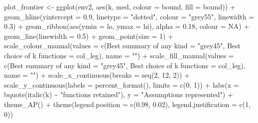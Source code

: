 \documentclass[
  11pt,
]{article}
\newenvironment{Shaded}{\begin{snugshade}}{\end{snugshade}}
\newcommand{\AttributeTok}[1]{\textcolor[rgb]{0.77,0.63,0.00}{#1}}
\newcommand{\ConstantTok}[1]{\textcolor[rgb]{0.00,0.00,0.00}{#1}}
\newcommand{\DecValTok}[1]{\textcolor[rgb]{0.00,0.00,0.81}{#1}}
\newcommand{\FloatTok}[1]{\textcolor[rgb]{0.00,0.00,0.81}{#1}}
\newcommand{\FunctionTok}[1]{\textcolor[rgb]{0.00,0.00,0.00}{#1}}
\newcommand{\NormalTok}[1]{#1}
\newcommand{\OtherTok}[1]{\textcolor[rgb]{0.56,0.35,0.01}{#1}}
\newcommand{\SpecialCharTok}[1]{\textcolor[rgb]{0.00,0.00,0.00}{#1}}
\newcommand{\StringTok}[1]{\textcolor[rgb]{0.31,0.60,0.02}{#1}}
\begin{document}
\begin{Shaded}
\begin{Highlighting}[]
\NormalTok{plot\_frontier }\OtherTok{\textless{}{-}} \FunctionTok{ggplot}\NormalTok{(env2, }\FunctionTok{aes}\NormalTok{(k, med, }\AttributeTok{colour =}\NormalTok{ bound, }\AttributeTok{fill =}\NormalTok{ bound)) }\SpecialCharTok{+}
  \FunctionTok{geom\_hline}\NormalTok{(}\AttributeTok{yintercept =} \FloatTok{0.9}\NormalTok{, }\AttributeTok{linetype =} \StringTok{"dotted"}\NormalTok{, }\AttributeTok{colour =} \StringTok{"grey55"}\NormalTok{,}
             \AttributeTok{linewidth =} \FloatTok{0.3}\NormalTok{) }\SpecialCharTok{+}
  \FunctionTok{geom\_ribbon}\NormalTok{(}\FunctionTok{aes}\NormalTok{(}\AttributeTok{ymin =}\NormalTok{ lo, }\AttributeTok{ymax =}\NormalTok{ hi), }\AttributeTok{alpha =} \FloatTok{0.18}\NormalTok{, }\AttributeTok{colour =} \ConstantTok{NA}\NormalTok{) }\SpecialCharTok{+}
  \FunctionTok{geom\_line}\NormalTok{(}\AttributeTok{linewidth =} \FloatTok{0.5}\NormalTok{) }\SpecialCharTok{+}
  \FunctionTok{geom\_point}\NormalTok{(}\AttributeTok{size =} \DecValTok{1}\NormalTok{) }\SpecialCharTok{+}
  \FunctionTok{scale\_colour\_manual}\NormalTok{(}\AttributeTok{values =} \FunctionTok{c}\NormalTok{(}\StringTok{\textasciigrave{}}\AttributeTok{Best summary of any kind}\StringTok{\textasciigrave{}} \OtherTok{=} \StringTok{"grey45"}\NormalTok{,}
                                 \StringTok{\textasciigrave{}}\AttributeTok{Best choice of k functions}\StringTok{\textasciigrave{}} \OtherTok{=}\NormalTok{ col\_leg),}
                      \AttributeTok{name =} \StringTok{""}\NormalTok{) }\SpecialCharTok{+}
  \FunctionTok{scale\_fill\_manual}\NormalTok{(}\AttributeTok{values =} \FunctionTok{c}\NormalTok{(}\StringTok{\textasciigrave{}}\AttributeTok{Best summary of any kind}\StringTok{\textasciigrave{}} \OtherTok{=} \StringTok{"grey45"}\NormalTok{,}
                               \StringTok{\textasciigrave{}}\AttributeTok{Best choice of k functions}\StringTok{\textasciigrave{}} \OtherTok{=}\NormalTok{ col\_leg),}
                    \AttributeTok{name =} \StringTok{""}\NormalTok{) }\SpecialCharTok{+}
  \FunctionTok{scale\_x\_continuous}\NormalTok{(}\AttributeTok{breaks =} \FunctionTok{seq}\NormalTok{(}\DecValTok{2}\NormalTok{, }\DecValTok{12}\NormalTok{, }\DecValTok{2}\NormalTok{)) }\SpecialCharTok{+}
  \FunctionTok{scale\_y\_continuous}\NormalTok{(}\AttributeTok{labels =} \FunctionTok{percent\_format}\NormalTok{(), }\AttributeTok{limits =} \FunctionTok{c}\NormalTok{(}\DecValTok{0}\NormalTok{, }\DecValTok{1}\NormalTok{)) }\SpecialCharTok{+}
  \FunctionTok{labs}\NormalTok{(}\AttributeTok{x =} \FunctionTok{bquote}\NormalTok{(}\FunctionTok{italic}\NormalTok{(k) }\SpecialCharTok{\textasciitilde{}} \StringTok{"functions retained"}\NormalTok{), }\AttributeTok{y =} \StringTok{"Assumptions represented"}\NormalTok{) }\SpecialCharTok{+}
  \FunctionTok{theme\_AP}\NormalTok{() }\SpecialCharTok{+}
  \FunctionTok{theme}\NormalTok{(}\AttributeTok{legend.position =} \FunctionTok{c}\NormalTok{(}\FloatTok{0.98}\NormalTok{, }\FloatTok{0.02}\NormalTok{), }\AttributeTok{legend.justification =} \FunctionTok{c}\NormalTok{(}\DecValTok{1}\NormalTok{, }\DecValTok{0}\NormalTok{))}


\end{Highlighting}
\end{Shaded}
\end{document}
